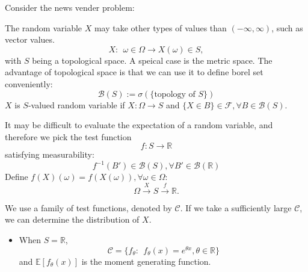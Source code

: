 \begin{example}
Consider the news vender problem:
\end{example}



The random variable $X$ may take other types of values than $(-\infty,\infty)$, such as vector values.
\[
X:~~\omega\in\Omega\to X(\omega)\in S,
\]
with $S$ being a topological space.
A speical case is the metric space.
The advantage of topological space is that we can use it to define borel set conveniently:
\[
\mathcal{B}(S):=\sigma(\{\mbox{topology of $S$}\})
\]
$X$ is $S$-valued random variable if $X:\Omega\to S$ and $\{X\in B\}\in\mathcal{F}, \forall B\in\mathcal{B}(S)$.

It may be difficult to evaluate the expectation of a random variable, and therefore we pick the test function
\[
f: S\to\mathbb{R}
\]
satisfying measurability:
\[
f^{-1}(B')\in\mathcal{B}(S), \forall B'\in\mathcal{B}(\mathbb{R})
\]
Define $f(X)(\omega) = f(X(\omega)), \forall \omega\in\Omega$:
\[
\Omega\xrightarrow{X} S\xrightarrow{f}\mathbb{R}.
\]

We use a family of test functions, denoted by $\mathcal{C}$.
If we take a sufficiently large $\mathcal{C}$, we can determine the distribution of $X$.
\begin{itemize}
\item
When $S=\mathbb{R}$,
\[
\mathcal{C} = \{f_{\theta}:~~f_{\theta}(x) = e^{\theta x}, \theta\in\mathbb{R}\}
\]
and $\mathbb{E}[f_{\theta}(x)]$ is the moment generating function.

\end{itemize}







